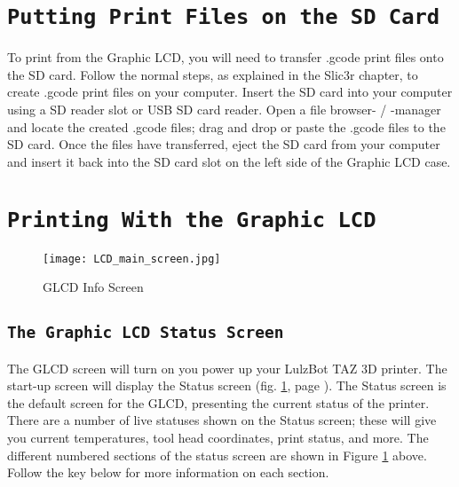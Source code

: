\section{\texttt{Putting Print Files on the SD Card}}
To print from the Graphic LCD, you will need to transfer .gcode print files onto the SD card. Follow the normal steps, as explained in the Slic3r chapter, to create .gcode print files on your computer. Insert the SD card into your computer using a SD reader slot or USB SD card reader. Open a file browser- / -manager and locate the created .gcode files; drag and drop or paste the .gcode files to the SD card. Once the files have transferred, eject the SD card from your computer and insert it back into the SD card slot on the left side of the Graphic LCD case.

\section{\texttt{Printing With the Graphic LCD}}
\begin{figure}[b]
\centering
\texttt{[image: LCD\_main\_screen.jpg]}
\caption{GLCD Info Screen}
\label{fig:info_screen}
\end{figure}

\subsection{\texttt{The Graphic LCD Status Screen}}
The GLCD screen will turn on you power up your LulzBot TAZ 3D printer. The start-up screen will display the Status screen (fig. \ref{fig:info_screen}, page \pageref{fig:info_screen}). The Status screen is the default screen for the GLCD, presenting the current status of the printer. There are a number of live statuses shown on the Status screen; these will give you current temperatures, tool head coordinates, print status, and more. The different numbered sections of the status screen are shown in Figure \ref{fig:info_screen} above. Follow the key below for more information on each section.

